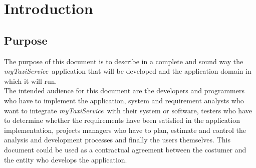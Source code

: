 \documentclass[a4paper,11pt]{report} %
\newcommand{\mts}{\mbox{\normalfont\itshape myTaxiService\ }}
\begin{document}
	\section{Introduction}
	
	\subsection{Purpose} The purpose of this document is to describe in a complete and sound way
	the \mts application that will be developed and the application domain in which it will run.\\
	The intended audience for this document are the developers and programmers
	who have to implement the application, system and requirement
	analysts who want to integrate \mts with their system or software,
	testers who have to determine whether the requirements have been satisfied in
	the application implementation, projects managers who have to plan, estimate
	and control the analysis and development processes and finally the users themselves.
	This document could be used as a contractual agreement between the costumer
	and the entity who develops the application.
	
\end{document}
